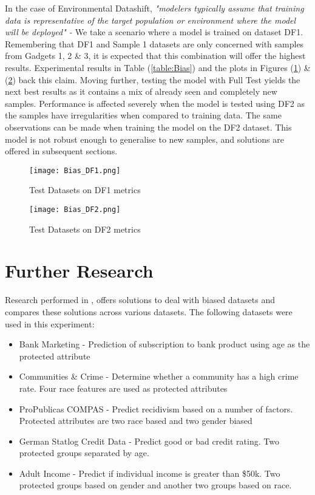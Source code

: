 \enlargethispage{\baselineskip}
In the case of Environmental Datashift,\textit{
"modelers typically assume that training data
is representative of the target population or environment where
the model will be deployed" - \cite{saria2019tutorial}}
We take a scenario where a model is trained on dataset DF1.
Remembering that DF1 and Sample 1 datasets are only concerned with samples from Gadgets 1, 2 \& 3, it is expected that this combination will offer the highest results.
Experimental results in Table (\ref{table:Bias}) and the plots in Figures (\ref{fig:DF1}) \& (\ref{fig:DF2}) back this claim. 
Moving further, testing the model with Full Test yields the next best results as it contains a mix of already seen and completely new samples.   
Performance is affected severely when the model is tested using DF2 as the samples have irregularities when compared to training data.
The same observations can be made when training the model on the DF2 dataset.
This model is not robust enough to generalise to new samples, and solutions are offered in subsequent sections. 

\begin{figure}[H]
    \texttt{[image: Bias\_DF1.png]}
    \centering
    \caption{Test Datasets on DF1 metrics}
    \label{fig:DF1}
\end{figure}

\begin{figure}[H]
    \texttt{[image: Bias\_DF2.png]}
    \centering
    \caption{Test Datasets on DF2 metrics}
    \label{fig:DF2}
\end{figure}



\section{Further Research}
Research performed in \cite{Jiang}, offers solutions to deal with biased datasets and compares these solutions across various datasets.
The following datasets were used in this experiment:
\begin{itemize}
    \item Bank Marketing - Prediction of subscription to bank product using age as the protected attribute
    \item Communities \& Crime - Determine whether a community has a high crime rate. Four race features are used as protected attributes
    \item ProPublicas COMPAS - Predict recidivism based on a number of factors. Protected attributes are two race based and two gender biased
    \item German Statlog Credit Data - Predict good or bad credit rating. Two protected groups separated by age.
    \item Adult Income - Predict if individual income is greater than \$50k. Two protected groups based on gender and another two groups based on race.
\end{itemize}

